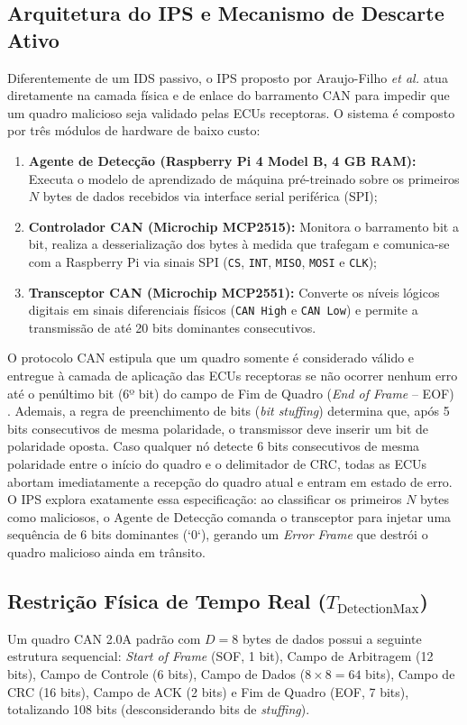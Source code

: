 \documentclass[conference]{IEEEtran}
\begin{document}
\subsection{Arquitetura do IPS e Mecanismo de Descarte Ativo}
Diferentemente de um IDS passivo, o IPS proposto por Araujo-Filho \textit{et al.} \cite{araujo2021efficient} atua diretamente na camada física e de enlace do barramento CAN para impedir que um quadro malicioso seja validado pelas ECUs receptoras. O sistema é composto por três módulos de hardware de baixo custo:
\begin{enumerate}
    \item \textbf{Agente de Detecção (Raspberry Pi 4 Model B, 4 GB RAM):} Executa o modelo de aprendizado de máquina pré-treinado sobre os primeiros $N$ bytes de dados recebidos via interface serial periférica (SPI);
    \item \textbf{Controlador CAN (Microchip MCP2515):} Monitora o barramento bit a bit, realiza a desserialização dos bytes à medida que trafegam e comunica-se com a Raspberry Pi via sinais SPI (\texttt{CS}, \texttt{INT}, \texttt{MISO}, \texttt{MOSI} e \texttt{CLK});
    \item \textbf{Transceptor CAN (Microchip MCP2551):} Converte os níveis lógicos digitais em sinais diferenciais físicos (\texttt{CAN High} e \texttt{CAN Low}) e permite a transmissão de até 20 bits dominantes consecutivos.
\end{enumerate}

O protocolo CAN estipula que um quadro somente é considerado válido e entregue à camada de aplicação das ECUs receptoras se não ocorrer nenhum erro até o penúltimo bit (6º bit) do campo de Fim de Quadro (\textit{End of Frame} -- EOF) \cite{bosch1991can}. Ademais, a regra de preenchimento de bits (\textit{bit stuffing}) determina que, após 5 bits consecutivos de mesma polaridade, o transmissor deve inserir um bit de polaridade oposta. Caso qualquer nó detecte 6 bits consecutivos de mesma polaridade entre o início do quadro e o delimitador de CRC, todas as ECUs abortam imediatamente a recepção do quadro atual e entram em estado de erro. O IPS explora exatamente essa especificação: ao classificar os primeiros $N$ bytes como maliciosos, o Agente de Detecção comanda o transceptor para injetar uma sequência de 6 bits dominantes (`0`), gerando um \textit{Error Frame} que destrói o quadro malicioso ainda em trânsito.

\subsection{Restrição Física de Tempo Real ($T_{\text{DetectionMax}}$)}
Um quadro CAN 2.0A padrão com $D = 8$ bytes de dados possui a seguinte estrutura sequencial: \textit{Start of Frame} (SOF, 1 bit), Campo de Arbitragem (12 bits), Campo de Controle (6 bits), Campo de Dados ($8 \times 8 = 64$ bits), Campo de CRC (16 bits), Campo de ACK (2 bits) e Fim de Quadro (EOF, 7 bits), totalizando 108 bits (desconsiderando bits de \textit{stuffing}).
\end{document}
